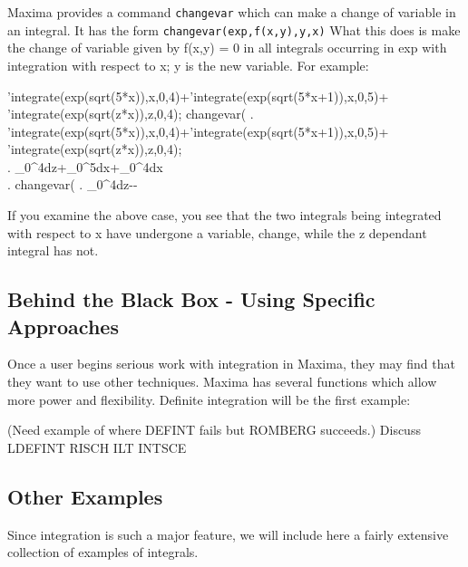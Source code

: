 Maxima provides a command {\tt changevar} which can make a change of
variable in an integral. It has the form {\tt changevar(exp,f(x,y),y,x)}
What this does is make the change of variable given by f(x,y) = 0 in all 
integrals occurring in exp with integration with respect to x; y is the 
new variable. For example:

\beginmaximasession
'integrate(exp(sqrt(5*x)),x,0,4)+'integrate(exp(sqrt(5*x+1)),x,0,5)+
'integrate(exp(sqrt(z*x)),z,0,4);
changevar(%
\maximatexsession
{}.  'integrate(exp(sqrt(5*x)),x,0,4)+'integrate(exp(sqrt(5*x+1)),x,0,5)+
'integrate(exp(sqrt(z*x)),z,0,4); \\
.  \int_{0}^{4}{\;dz}+\int_{0}^{5}{\;dx}+\int_{0}^{4}{\;dx} \\
.  changevar(%
.  \int_{0}^{4}{\;dz}-- \\
\endmaximasession

If you examine the above case, you see that the two integrals being
integrated with respect to x have undergone a variable, change, while
the z dependant integral has not.

\subsection{Behind the Black Box - Using Specific Approaches}

Once a user begins serious work with integration in Maxima, they may
find that they want to use other techniques.  Maxima has several
functions which allow more power and flexibility.  Definite integration
will be the first example:

(Need example of where DEFINT fails but ROMBERG succeeds.)  Discuss LDEFINT 
RISCH ILT INTSCE 

\subsection{Other Examples}
Since integration is such a major feature, we will include here a fairly
extensive collection of examples of integrals.


